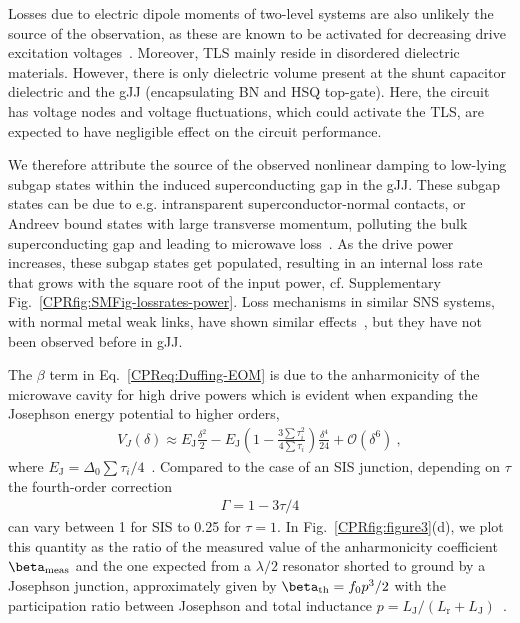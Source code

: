 Losses due to electric dipole moments of two-level systems are also unlikely the source of the observation, as these are known to be activated for decreasing drive excitation voltages~\cite{martinisDecoherenceJosephsonQubits2005c,oconnellMicrowaveDielectricLoss2008a,gunnarssonDielectricLossesMultilayer2013}.
%
Moreover, TLS mainly reside in disordered dielectric materials.
%
However, there is only dielectric volume present at the shunt capacitor dielectric and the gJJ (encapsulating BN and HSQ top-gate).
%
Here, the circuit has voltage nodes and voltage fluctuations, which could activate the TLS, are expected to have negligible effect on the circuit performance.

We therefore attribute the source of the observed nonlinear damping to low-lying subgap states within the induced superconducting gap in the gJJ.
%
These subgap states can be due to e.g. intransparent superconductor-normal contacts, or Andreev bound states with large transverse momentum, polluting the bulk superconducting gap and leading to microwave loss~\cite{schmidtBallisticGrapheneSuperconducting2018}.
%
As the drive power increases, these subgap states get populated, resulting in an internal loss rate that grows with the square root of the input power, cf. Supplementary Fig.~\ref{CPRfig:SMFig-lossrates-power}.
%
Loss mechanisms in similar SNS systems, with normal metal weak links, have shown similar effects~\cite{fuechsleEffectMicrowavesCurrentPhase2009,dassonnevilleDissipationSupercurrentFluctuations2013}, but they have not been observed before in gJJ.

The $\beta$ term in Eq.~\ref{CPReq:Duffing-EOM} is due to the anharmonicity of the microwave cavity for high drive powers which is evident when expanding the Josephson energy potential to higher orders,
\begin{align}
V_J(\delta) \approx E_\text{J} \frac{\delta^2}{2} - E_\text{J}\left( 1-\frac{3\sum\tau_i^2}{4\sum\tau_i} \right) \frac{\delta^4}{24} +\mathcal{O}(\delta^6)\ , 
\label{CPReq:EJtaylor}
\end{align}
%
where $E_\text{J}=\Delta_0\sum\tau_i/4$~\cite{kringhojAnharmonicitySuperconductingQubit2018}.
%
Compared to the case of an SIS junction, depending on $\tau$ the fourth-order correction 
%
\begin{align}
\Gamma = 1-3\tau/4
\label{CPReq:Ejcorrection}
\end{align} 
%
can vary between 1 for SIS to 0.25 for $\tau=1$.
%
In Fig.~\ref{CPRfig:figure3}(d), we plot this quantity as the ratio of the measured value of the anharmonicity coefficient $\beta_{\rm meas}$ and the one expected from a $\lambda/2$ resonator shorted to ground by a Josephson junction, approximately given by $\beta_{\rm th}=f_0p^3/2$ with the participation ratio between Josephson and total inductance $p=L_\text{J}/(L_\text{r}+L_\text{J})$~\cite{wilsonPhotonGenerationElectromagnetic2010b,zhouHighgainWeaklyNonlinear2014}.



